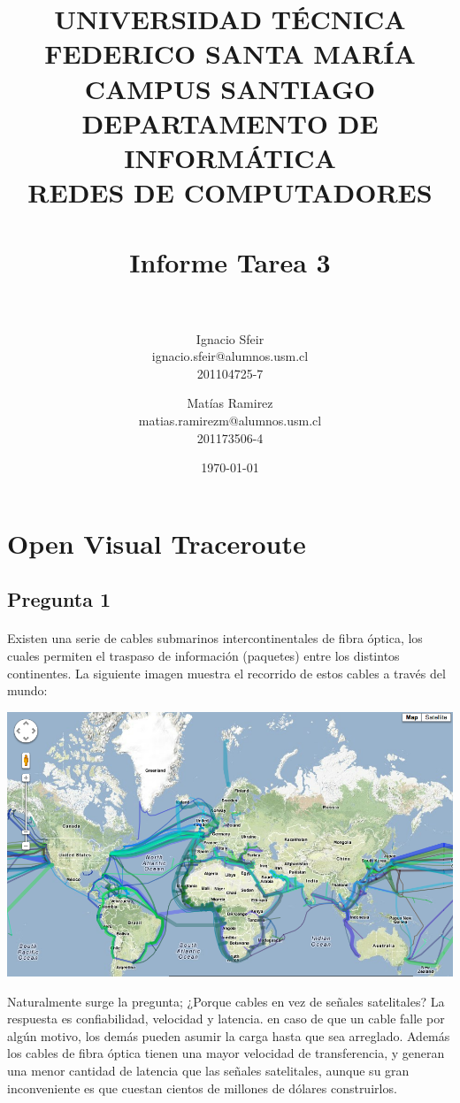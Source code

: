 \documentclass[paper=a4, fontsize=11pt]{scrartcl}
\title{
		\usefont{OT1}{bch}{b}{n}
		\normalfont \normalsize \textsc{UNIVERSIDAD TÉCNICA FEDERICO SANTA MARÍA\\
CAMPUS SANTIAGO\\
DEPARTAMENTO DE INFORMÁTICA\\
REDES DE COMPUTADORES
} \\ [25pt]
		\horrule{0.5pt} \\[0.4cm]
		\huge Informe Tarea 3 \\
		\horrule{2pt} \\[0.5cm]
}
\author{
\normalfont 
  Ignacio Sfeir\\[-3pt]
  \normalfont \normalsize
  ignacio.sfeir@alumnos.usm.cl\\[-3pt]
  \normalfont \normalsize
  201104725-7\\[-3pt]
  \and
  \normalfont 
  Mat\'ias Ramirez\\[-3pt]
  \normalfont \normalsize
  matias.ramirezm@alumnos.usm.cl\\[-3pt]
  \normalfont \normalsize
  201173506-4\\[-3pt]
  \and \normalfont
  \today
}
\date{}
\numberwithin{equation}{section}		%
\numberwithin{figure}{section}			%
\numberwithin{table}{section}				%
\begin{document}
\maketitle


\clearpage \newpage

\section*{Open Visual Traceroute}

\subsection*{Pregunta 1}
\paragraph{} \hspace{0pt}

Existen una serie de cables submarinos intercontinentales de fibra \'optica, los cuales permiten el traspaso de informaci\'on (paquetes) entre los distintos continentes. La siguiente imagen muestra el recorrido de estos cables a trav\'es del mundo:\\

\graphicspath{{fotos/}}

\includegraphics[width=1\textwidth]{under-sea-cable-map.png}

Naturalmente surge  la pregunta; ¿Porque cables en vez de señales satelitales? La respuesta es confiabilidad, velocidad y latencia. en caso de que un cable falle por alg\'un motivo, los dem\'as pueden asumir la carga hasta que sea arreglado. Adem\'as los cables de fibra \'optica tienen una mayor velocidad de transferencia, y generan una menor cantidad de latencia que las señales satelitales, aunque su gran inconveniente es que cuestan cientos de millones de dólares construirlos.\\
\end{document}
